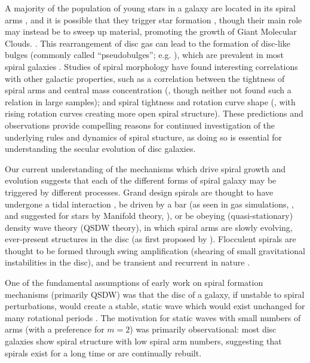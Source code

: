 A majority of the population of young stars in a galaxy are located in its spiral arms \citep{2011EAS....51...19E}, and it is possible that they trigger star formation \citep{2013A&A...560A..59C}, though their main role may instead be to sweep up material, promoting the growth of Giant Molecular Clouds. \citep{2014IAUS..298..221D}. This rearrangement of disc gas can lead to the formation of disc-like bulges (commonly called ``pseudobulges''; e.g. \citealt{2004ARA&A..42..603K}), which are prevalent in most spiral galaxies \citep{2018MNRAS.473.4731K,2010ApJ...716..942F}. Studies of spiral morphology have found interesting correlations with other galactic properties, such as a correlation between the tightness of spiral arms and central mass concentration (\citealt{2019ApJ...871..194Y}, though neither \citealt{2017MNRAS.472.2263H} not \citealt{2019MNRAS.487.1808M} found such a relation in large samples); and spiral tightness and rotation curve shape (\citealt{2005MNRAS.359.1065S}, with rising rotation curves creating more open spiral structure). These predictions and observations provide compelling reasons for continued investigation of the underlying rules and dynamics of spiral stucture, as doing so is essential for understanding the secular evolution of disc galaxies.

Our current understanding of the mechanisms which drive spiral growth and evolution suggests that each of the different forms of spiral galaxy may be triggered by different processes. Grand design spirals are thought to have undergone a tidal interaction \citep{2010MNRAS.403..625D,2017ApJ...834....7S}, be driven by a bar (as seen in gas simulations, \citealt{1976ApJ...209...53S,2008A&A...489..115R}, and suggested for stars by Manifold theory, \citealt{2006A&A...453...39R,2009MNRAS.394...67A,2009MNRAS.400.1706A}), or be obeying (quasi-stationary) density wave theory (QSDW theory), in which spiral arms are slowly evolving, ever-present structures in the disc (as first proposed by \citealt{1964ApJ...140..646L}). Flocculent spirals are thought to be formed through swing amplification (shearing of small gravitational instabilities in the disc), and be transient and recurrent in nature \citep{1966ApJ...146..810J}.

One of the fundamental assumptions of early work on spiral formation mechanisms (primarily QSDW) was that the disc of a galaxy, if unstable to spiral perturbations, would create a stable, static wave which would exist unchanged for many rotational periods \citep{1964ApJ...140..646L}. The motivation for static waves with small numbers of arms (with a preference for $m=2$) was primarily observational: most disc galaxies show spiral structure with low spiral arm numbers, suggesting that spirals exist for a long time or are continually rebuilt.

